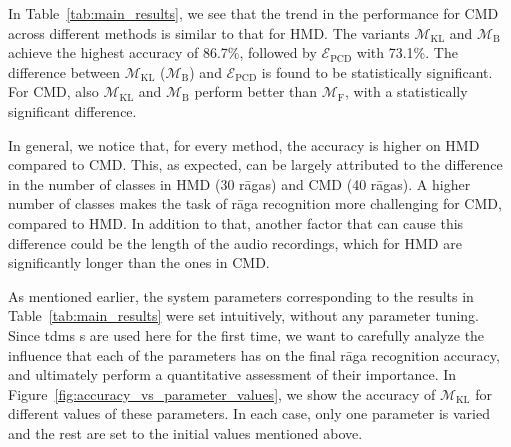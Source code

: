 In Table~\ref{tab:main_results}, we see that the trend in the performance for  CMD across different methods is similar to that for  HMD. The variants $\mathcal{M}_{\mathrm{KL}}$ and $\mathcal{M}_{\mathrm{B}}$ achieve the highest accuracy of 86.7\%, followed by $\mathcal{E}_{\mathrm{PCD}}$ with 73.1\%. The difference between $\mathcal{M}_{\mathrm{KL}}$ ($\mathcal{M}_{\mathrm{B}}$) and $\mathcal{E}_{\mathrm{PCD}}$ is found to be statistically significant.  For CMD, also  $\mathcal{M}_{\mathrm{KL}}$ and $\mathcal{M}_{\mathrm{B}}$ perform better than $\mathcal{M}_{\mathrm{F}}$, with a statistically significant difference. 

In general, we notice that, for every method, the accuracy is higher on HMD compared to CMD. This, as expected, can be largely attributed to the difference in the number of classes in  HMD (30 r\={a}gas) and  CMD (40 r\={a}gas). A higher number of classes makes the task of r\={a}ga recognition more challenging for  CMD, compared to  HMD. In addition to that, another factor that can cause this difference could be the length of the audio recordings, which for  HMD are significantly longer than the ones in CMD.

As mentioned earlier, the system parameters corresponding to the results in Table~\ref{tab:main_results} were set intuitively, without any parameter tuning. Since \gls{tdms} s are used here for the first time, we want to carefully analyze the influence that each of the parameters has on the final r\={a}ga recognition accuracy, and ultimately perform a quantitative assessment of their importance. In Figure~\ref{fig:accuracy_vs_parameter_values}, we show the accuracy of $\mathcal{M}_{\mathrm{KL}}$ for different values of these parameters. In each case, only one parameter is varied and the rest are set to the initial values mentioned above. 

